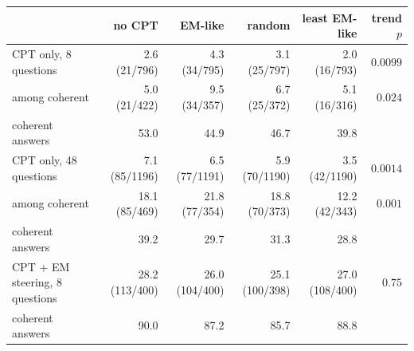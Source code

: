 \begin{tabular}{@{}lrrrrr@{}}
\toprule
 & no CPT & EM-like & random & least EM-like & trend $p$ \\
\midrule
CPT only, 8 questions & 2.6 {\scriptsize(21/796)} & 4.3 {\scriptsize(34/795)} & 3.1 {\scriptsize(25/797)} & 2.0 {\scriptsize(16/793)} & $0.0099$ \\
\quad among coherent & 5.0 {\scriptsize(21/422)} & 9.5 {\scriptsize(34/357)} & 6.7 {\scriptsize(25/372)} & 5.1 {\scriptsize(16/316)} & $0.024$ \\
\quad coherent answers & 53.0 & 44.9 & 46.7 & 39.8 &  \\
CPT only, 48 questions & 7.1 {\scriptsize(85/1196)} & 6.5 {\scriptsize(77/1191)} & 5.9 {\scriptsize(70/1190)} & 3.5 {\scriptsize(42/1190)} & $0.0014$ \\
\quad among coherent & 18.1 {\scriptsize(85/469)} & 21.8 {\scriptsize(77/354)} & 18.8 {\scriptsize(70/373)} & 12.2 {\scriptsize(42/343)} & $0.001$ \\
\quad coherent answers & 39.2 & 29.7 & 31.3 & 28.8 &  \\
CPT + EM steering, 8 questions & 28.2 {\scriptsize(113/400)} & 26.0 {\scriptsize(104/400)} & 25.1 {\scriptsize(100/398)} & 27.0 {\scriptsize(108/400)} & $0.75$ \\
\quad coherent answers & 90.0 & 87.2 & 85.7 & 88.8 &  \\
\bottomrule
\end{tabular}
